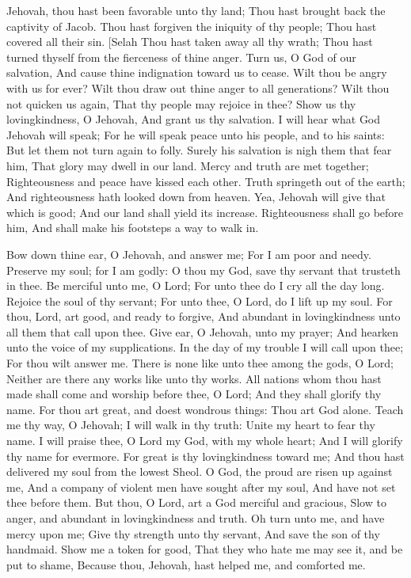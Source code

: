 Jehovah, thou hast been favorable unto thy land; Thou hast brought back the captivity of Jacob.  Thou hast forgiven the iniquity of thy people; Thou hast covered all their sin. [Selah  Thou hast taken away all thy wrath; Thou hast turned thyself from the fierceness of thine anger.  Turn us, O God of our salvation, And cause thine indignation toward us to cease.  Wilt thou be angry with us for ever? Wilt thou draw out thine anger to all generations?  Wilt thou not quicken us again, That thy people may rejoice in thee?  Show us thy lovingkindness, O Jehovah, And grant us thy salvation.  I will hear what God Jehovah will speak; For he will speak peace unto his people, and to his saints: But let them not turn again to folly.  Surely his salvation is nigh them that fear him, That glory may dwell in our land.  Mercy and truth are met together; Righteousness and peace have kissed each other.  Truth springeth out of the earth; And righteousness hath looked down from heaven.  Yea, Jehovah will give that which is good; And our land shall yield its increase.  Righteousness shall go before him, And shall make his footsteps a way to walk in. 

Bow down thine ear, O Jehovah, and answer me; For I am poor and needy.  Preserve my soul; for I am godly: O thou my God, save thy servant that trusteth in thee.  Be merciful unto me, O Lord; For unto thee do I cry all the day long.  Rejoice the soul of thy servant; For unto thee, O Lord, do I lift up my soul.  For thou, Lord, art good, and ready to forgive, And abundant in lovingkindness unto all them that call upon thee.  Give ear, O Jehovah, unto my prayer; And hearken unto the voice of my supplications.  In the day of my trouble I will call upon thee; For thou wilt answer me.  There is none like unto thee among the gods, O Lord; Neither are there any works like unto thy works.  All nations whom thou hast made shall come and worship before thee, O Lord; And they shall glorify thy name.  For thou art great, and doest wondrous things: Thou art God alone.  Teach me thy way, O Jehovah; I will walk in thy truth: Unite my heart to fear thy name.  I will praise thee, O Lord my God, with my whole heart; And I will glorify thy name for evermore.  For great is thy lovingkindness toward me; And thou hast delivered my soul from the lowest Sheol.  O God, the proud are risen up against me, And a company of violent men have sought after my soul, And have not set thee before them.  But thou, O Lord, art a God merciful and gracious, Slow to anger, and abundant in lovingkindness and truth.  Oh turn unto me, and have mercy upon me; Give thy strength unto thy servant, And save the son of thy handmaid.  Show me a token for good, That they who hate me may see it, and be put to shame, Because thou, Jehovah, hast helped me, and comforted me. 

